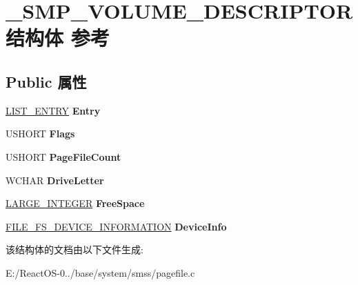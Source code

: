 \hypertarget{struct___s_m_p___v_o_l_u_m_e___d_e_s_c_r_i_p_t_o_r}{}\section{\+\_\+\+S\+M\+P\+\_\+\+V\+O\+L\+U\+M\+E\+\_\+\+D\+E\+S\+C\+R\+I\+P\+T\+O\+R结构体 参考}
\label{struct___s_m_p___v_o_l_u_m_e___d_e_s_c_r_i_p_t_o_r}
\subsection*{Public 属性}
\begin{DoxyCompactItemize}
\item 
\mbox{\label{struct___s_m_p___v_o_l_u_m_e___d_e_s_c_r_i_p_t_o_r_a43b50e3d2820fae147acc1d242bb3ad0}} 
\hyperlink{struct___l_i_s_t___e_n_t_r_y}{L\+I\+S\+T\+\_\+\+E\+N\+T\+RY} {\bfseries Entry}
\item 
\mbox{\label{struct___s_m_p___v_o_l_u_m_e___d_e_s_c_r_i_p_t_o_r_a715dd98fbe2c49425cd264ea364b93d9}} 
U\+S\+H\+O\+RT {\bfseries Flags}
\item 
\mbox{\label{struct___s_m_p___v_o_l_u_m_e___d_e_s_c_r_i_p_t_o_r_a6defb458e5fc15581b9c47ebb74bff37}} 
U\+S\+H\+O\+RT {\bfseries Page\+File\+Count}
\item 
\mbox{\label{struct___s_m_p___v_o_l_u_m_e___d_e_s_c_r_i_p_t_o_r_a8b27fc2989a234c4f1e677b71759bbd3}} 
W\+C\+H\+AR {\bfseries Drive\+Letter}
\item 
\mbox{\label{struct___s_m_p___v_o_l_u_m_e___d_e_s_c_r_i_p_t_o_r_a4ef5eb9edabf76c4af0214dc6c4aae3f}} 
\hyperlink{union___l_a_r_g_e___i_n_t_e_g_e_r}{L\+A\+R\+G\+E\+\_\+\+I\+N\+T\+E\+G\+ER} {\bfseries Free\+Space}
\item 
\mbox{\label{struct___s_m_p___v_o_l_u_m_e___d_e_s_c_r_i_p_t_o_r_ae563c4485f2c9b57f6b10275c3e9164d}} 
\hyperlink{struct___f_i_l_e___f_s___d_e_v_i_c_e___i_n_f_o_r_m_a_t_i_o_n}{F\+I\+L\+E\+\_\+\+F\+S\+\_\+\+D\+E\+V\+I\+C\+E\+\_\+\+I\+N\+F\+O\+R\+M\+A\+T\+I\+ON} {\bfseries Device\+Info}
\end{DoxyCompactItemize}


该结构体的文档由以下文件生成\+:\begin{DoxyCompactItemize}
\item 
E\+:/\+React\+O\+S-\/0../base/system/smss/pagefile.\+c\end{DoxyCompactItemize}
